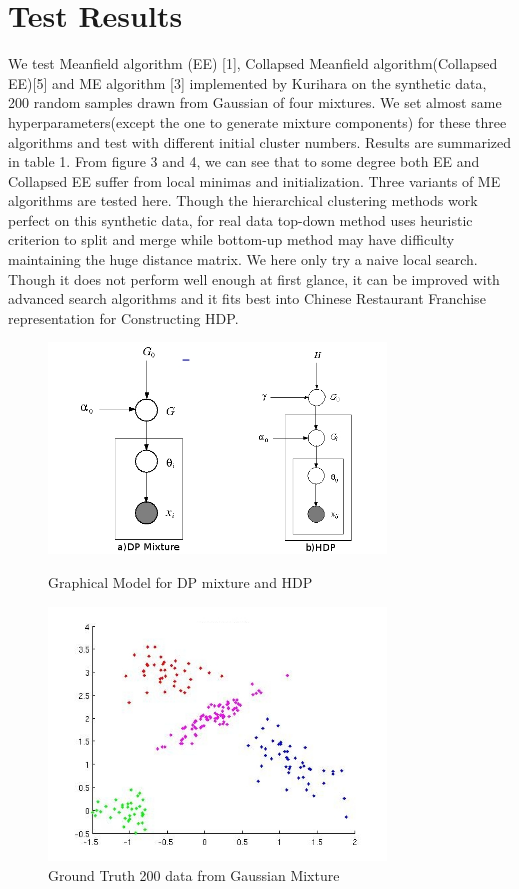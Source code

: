 \documentclass{article}
\begin{document}
\section{Test Results}
We test Meanfield algorithm (EE) [1], Collapsed Meanfield algorithm(Collapsed EE)[5] and ME algorithm [3] implemented by Kurihara on the synthetic data, 200 random samples drawn from Gaussian of four mixtures.
We set almost same hyperparameters(except the one to generate mixture components) for these three algorithms and test with different initial cluster numbers.
Results are summarized in table 1. 
From figure 3 and 4, we can see that to some degree both EE and Collapsed EE suffer from local minimas and initialization.
Three variants of ME algorithms are tested here. Though the hierarchical clustering methods work perfect on this synthetic data, for real data top-down method uses heuristic criterion to split and merge while bottom-up method may have difficulty maintaining the huge distance matrix.
We here only try a naive local search. Though it does not perform well enough at first glance, it can be improved with advanced search algorithms and it fits best into Chinese Restaurant Franchise representation for Constructing HDP.
\begin{figure}[h] 
  \begin{minipage}[b]{0.5\textwidth} 
    \centering 
    \includegraphics[width=0.8\textwidth]{dp.jpg} 
    \caption{Graphical Model for DP mixture and HDP} 
    \label{fig:by:table} 
  \end{minipage}%
  \begin{minipage}[b]{0.5\textwidth} 
    \centering 
    \includegraphics[width=0.8\textwidth]{truth.jpg} 
    \caption{Ground Truth 200 data from Gaussian Mixture} 
    \label{fig:by:table}  
   \end{minipage}%
   \end{figure}
\end{document}
